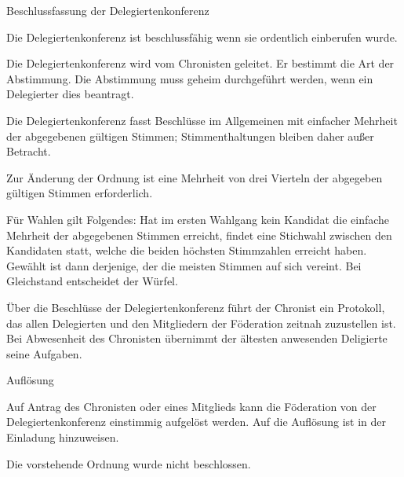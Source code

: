 \documentclass[11pt,a4paper,twoside,openany,article]{memoir}
\begin{document}
\begin{para}{Beschlussfassung der Delegiertenkonferenz}
\label{p:beschlussfassung}
\item Die Delegiertenkonferenz ist beschlussfähig wenn sie ordentlich einberufen wurde.
\item Die Delegiertenkonferenz wird vom Chronisten geleitet. Er bestimmt die Art der Abstimmung. Die Abstimmung muss geheim durchgeführt werden, wenn ein Delegierter dies beantragt.
\item Die Delegiertenkonferenz fasst Beschlüsse im Allgemeinen mit einfacher Mehrheit der abgegebenen gültigen Stimmen; Stimmenthaltungen bleiben daher außer Betracht.
\item Zur Änderung der Ordnung ist eine Mehrheit von drei Vierteln der abgegeben gültigen Stimmen erforderlich.
\item Für Wahlen gilt Folgendes: Hat im ersten Wahlgang kein Kandidat die einfache Mehrheit der abgegebenen Stimmen erreicht, findet eine Stichwahl zwischen den Kandidaten statt, welche die beiden höchsten Stimmzahlen erreicht haben. Gewählt ist dann derjenige, der die meisten Stimmen auf sich vereint. Bei Gleichstand entscheidet der Würfel.
\item Über die Beschlüsse der Delegiertenkonferenz führt der Chronist ein Protokoll, das allen Delegierten und den Mitgliedern der Föderation zeitnah zuzustellen ist.
Bei Abwesenheit des Chronisten übernimmt der ältesten anwesenden Deligierte seine Aufgaben.
\end{para}

\begin{para}{Auflösung}
\label{p:auflösung}
\item Auf Antrag des Chronisten oder eines Mitglieds kann die Föderation von der Delegiertenkonferenz einstimmig aufgelöst werden. Auf die Auflösung ist in der Einladung hinzuweisen.
\end{para}

\begin{changes}
\item Die vorstehende Ordnung wurde nicht beschlossen.\end{changes}
\end{document}
